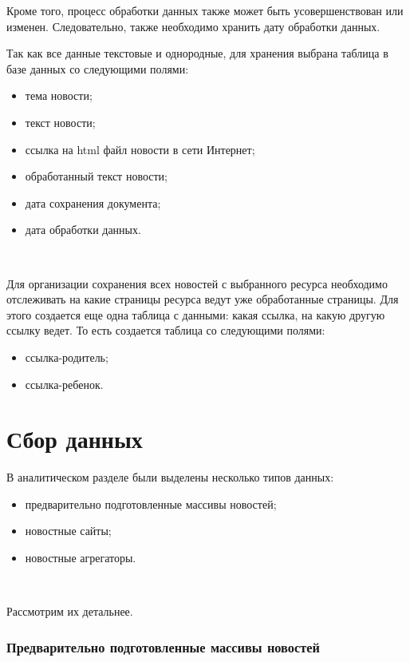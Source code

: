 Кроме того, процесс обработки данных также может быть усовершенствован или изменен. Следовательно, также необходимо хранить дату обработки данных.

Так как все данные текстовые и однородные, для хранения выбрана таблица в базе данных со следующими полями: 

\begin{itemize}
    \item тема новости;
    \item текст новости; 
    \item ссылка на html файл новости в сети Интернет;
    \item обработанный текст новости;
    \item дата сохранения документа;
    \item дата обработки данных.
\end{itemize}

~\

Для организации сохранения всех новостей с выбранного ресурса необходимо отслеживать на какие страницы ресурса ведут уже обработанные страницы. Для этого создается еще одна таблица с данными: какая ссылка, на какую другую ссылку ведет. То есть создается таблица со следующими полями: 

\begin{itemize}
    \item ссылка-родитель;
    \item ссылка-ребенок.
\end{itemize}

%
\section{Сбор данных}


В аналитическом разделе были выделены несколько типов данных: 

\begin{itemize}
    \item предварительно подготовленные массивы новостей; 
    \item новостные сайты;
    \item новостные агрегаторы.
\end{itemize}

~\

Рассмотрим их детальнее. 

%
\subsubsection{Предварительно подготовленные массивы новостей}

